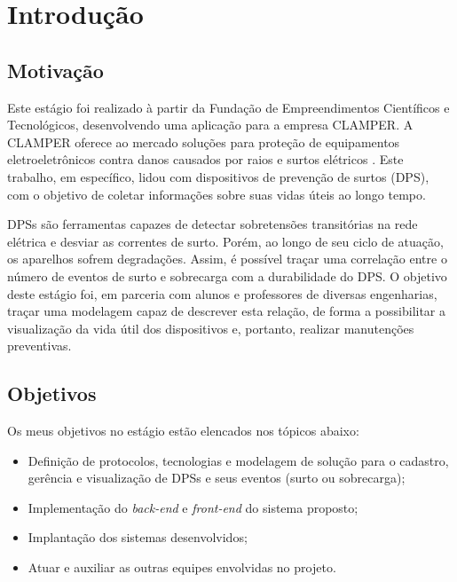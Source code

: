 \chapter[Introdução]{Introdução}

\section{Motivação}
Este estágio foi realizado à partir da Fundação de Empreendimentos Científicos e
Tecnológicos, desenvolvendo uma aplicação para a empresa CLAMPER. A CLAMPER
oferece ao mercado soluções para proteção de equipamentos eletroeletrônicos
contra danos causados por raios e surtos elétricos \cite{clamper}. Este
trabalho, em específico, lidou com dispositivos de prevenção de surtos (DPS),
com o objetivo de coletar informações sobre suas vidas úteis ao longo tempo.

DPSs são ferramentas capazes de detectar sobretensões transitórias na rede
elétrica e desviar as correntes de surto. Porém, ao longo de seu ciclo de
atuação, os aparelhos sofrem degradações. Assim, é possível traçar uma
correlação entre o número de eventos de surto e sobrecarga com a durabilidade do
DPS. O objetivo deste estágio foi, em parceria com alunos e professores de
diversas engenharias, traçar uma modelagem capaz de descrever esta relação, de
forma a possibilitar a visualização da vida útil dos dispositivos e, portanto,
realizar manutenções preventivas.

\section{Objetivos}
Os meus objetivos no estágio estão elencados nos tópicos abaixo:

\begin{itemize}
  \item Definição de protocolos, tecnologias e modelagem de solução para o
  cadastro, gerência e visualização de DPSs e seus eventos (surto ou sobrecarga);

  \item Implementação do \textit{back-end} e \textit{front-end} do sistema proposto;

  \item Implantação dos sistemas desenvolvidos;

  \item Atuar e auxiliar as outras equipes envolvidas no projeto.
  
\end{itemize}